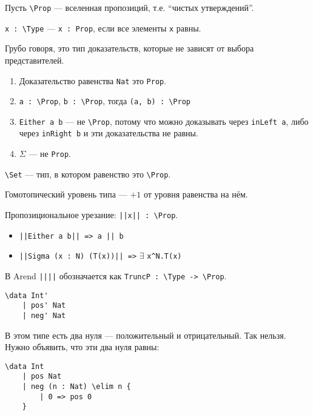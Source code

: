 Пусть \texttt{\textbackslash{}Prop} --- вселенная пропозиций, т.е. ``чистых утверждений''.

\begin{definition}
    \texttt{x : \textbackslash{}Type} --- \texttt{x : Prop}, если все элементы \texttt{x} равны.
\end{definition}
Грубо говоря, это тип доказательств, которые не зависят от выбора представителей.

\begin{example}\itemfix
    \begin{enumerate}
        \item Доказательство равенства \texttt{Nat} это \texttt{Prop}.
        \item \texttt{a : \textbackslash{}Prop}, \texttt{b : \textbackslash{}Prop}, тогда \texttt{(a, b) : \textbackslash{}Prop}
        \item \texttt{Either a b} --- не \texttt{\textbackslash{}Prop}, потому что можно доказывать через \texttt{inLeft a}, либо через \texttt{inRight b} и эти доказательства не равны.
        \item \(\Sigma\) --- не \texttt{Prop}.
    \end{enumerate}
\end{example}

\begin{definition}
    \texttt{\textbackslash{}Set} --- тип, в котором равенство это \texttt{\textbackslash{}Prop}.
\end{definition}

Гомотопический уровень типа --- \( + 1\) от уровня равенства на нём.

Пропозициональное урезание: \texttt{||x|| : \textbackslash{}Prop}.

\begin{example}\itemfix
    \begin{itemize}
        \item \texttt{||Either a b|| => a || b}
        \item \texttt{||Sigma (x : N) (T(x))|| =>} \(\exists\) \texttt{x\^{}N.T(x)}
    \end{itemize}
\end{example}

В Arend \texttt{||||} обозначается как \texttt{TruncP : \textbackslash{}Type -> \textbackslash{}Prop}.

\begin{example}\itemfix
    \begin{verbatim}
\data Int'
    | pos' Nat
    | neg' Nat
    \end{verbatim}

    В этом типе есть два нуля --- положительный и отрицательный. Так нельзя. Нужно объявить, что эти два нуля равны:
    \begin{verbatim}
\data Int
    | pos Nat
    | neg (n : Nat) \elim n {
        | 0 => pos 0
    }
    \end{verbatim}
\end{example}

